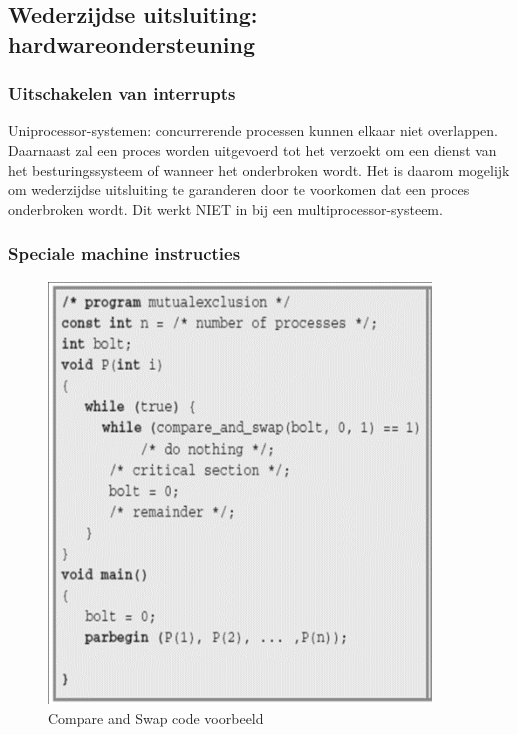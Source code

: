 \subsection{Wederzijdse uitsluiting: hardwareondersteuning}

\subsubsection{Uitschakelen van interrupts}

Uniprocessor-systemen: concurrerende processen kunnen elkaar niet overlappen. Daarnaast zal een proces worden uitgevoerd tot het verzoekt om een dienst van het besturingssysteem of wanneer het onderbroken wordt. Het is daarom mogelijk om wederzijdse uitsluiting te garanderen door te voorkomen dat een proces onderbroken wordt. Dit werkt NIET in bij een multiprocessor-systeem.

\subsubsection{Speciale machine instructies}

\begin{figure}[htp]
    \centering
            \includegraphics[width=4in]{img/compareandswap.png}
        \caption{Compare and Swap code voorbeeld}
    \label{fig:Compare and Swap code voorbeeld}
\end{figure}

